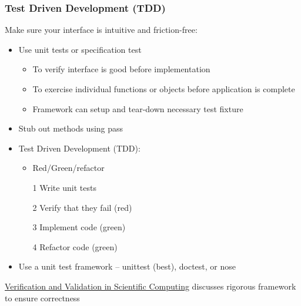 \documentclass[table,dvipsnames]{beamer}
\newcommand{\keywd}{\textcolor{myorange}}
\begin{document}
\begin{frame}[fragile]
\frametitle{Test Driven Development (TDD)}
\footnotesize
Make sure your interface is intuitive and friction-free:

\begin{itemize}
    \item Use unit tests or specification test
        \begin{itemize}
        \footnotesize
            \item To verify interface is good before implementation
            \item To exercise individual functions or objects before application is complete
            \item Framework can setup and tear-down necessary test fixture
        \end{itemize}
    \item Stub out methods using pass
    \item Test Driven Development (TDD):
        \begin{itemize}
        \footnotesize
        \item Red/Green/refactor
        \item[1] Write unit tests
        \item[2] Verify that they fail (red)
        \item[3] Implement code (green)
        \item[4] Refactor code (green)
        \end{itemize}
    \item Use a \keywd{unit test} framework -- unittest (best), doctest, or nose
\end{itemize}
\begin{flushleft}
 \tiny \href{http://www.amazon.com/Verification-Validation-Scientific-Computing-Oberkampf/dp/0521113601/ref=pd_sim_14_2?ie=UTF8&refRID=1WP5FV5JCHXYAJAN6XAK}{Verification and Validation in Scientific Computing} discusses rigorous framework to ensure correctness
\end{flushleft}
\end{frame}
\end{document}
